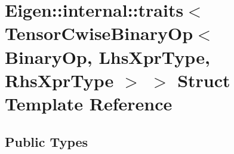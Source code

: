\hypertarget{struct_eigen_1_1internal_1_1traits_3_01_tensor_cwise_binary_op_3_01_binary_op_00_01_lhs_xpr_type_00_01_rhs_xpr_type_01_4_01_4}{}\section{Eigen\+:\+:internal\+:\+:traits$<$ Tensor\+Cwise\+Binary\+Op$<$ Binary\+Op, Lhs\+Xpr\+Type, Rhs\+Xpr\+Type $>$ $>$ Struct Template Reference}
\label{struct_eigen_1_1internal_1_1traits_3_01_tensor_cwise_binary_op_3_01_binary_op_00_01_lhs_xpr_type_00_01_rhs_xpr_type_01_4_01_4}
\subsection*{Public Types}
